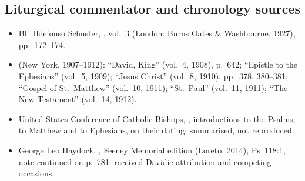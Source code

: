 {\subsection*{Liturgical commentator and chronology sources}
\begin{itemize}\setlength{\itemsep}{0.15em}\setlength{\parskip}{0pt}
\item Bl.\ Ildefonso Schuster, , vol.~3 (London: Burns Oates \& Washbourne, 1927), pp.~172--174.
\item {} (New York, 1907--1912): ``David, King'' (vol.~4, 1908), p.~642; ``Epistle to the Ephesians'' (vol.~5, 1909); ``Jesus Christ'' (vol.~8, 1910), pp.~378, 380--381; ``Gospel of St.\ Matthew'' (vol.~10, 1911); ``St.\ Paul'' (vol.~11, 1911); ``The New Testament'' (vol.~14, 1912).
\item United States Conference of Catholic Bishops, , introductions to the Psalms, to Matthew and to Ephesians, on their dating; summarised, not reproduced.
\item George Leo Haydock, , Feeney Memorial edition (Loreto, 2014), Ps~118:1, note continued on p.~781: received Davidic attribution and competing occasions.
\end{itemize}
\par}
